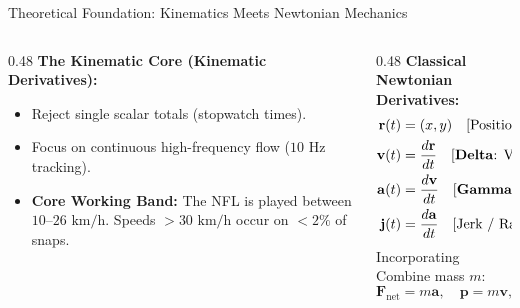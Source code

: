 \documentclass[aspectratio=169, 10pt]{beamer}
\begin{document}
\begin{frame}{Theoretical Foundation: Kinematics Meets Newtonian Mechanics}
  \begin{columns}[T]
    \begin{column}{0.48\textwidth}
      \textbf{The Kinematic Core (Kinematic Derivatives):}
      \begin{itemize}
        \item Reject single scalar totals (stopwatch times).
        \item Focus on continuous high-frequency flow ($10\text{ Hz}$ tracking).
        \item \textbf{Core Working Band:} The NFL is played between $10\text{--}26\text{ km/h}$. Speeds $>30\text{ km/h}$ occur on $<2\%$ of snaps.
      \end{itemize}
    \end{column}
    \begin{column}{0.48\textwidth}
      \textbf{Classical Newtonian Derivatives:}
      \begin{align*}
        \mathbf{r}(t) &= (x, y) \quad \text{[Position]} \\
        \mathbf{v}(t) &= \frac{d\mathbf{r}}{dt} \quad \text{[\textbf{Delta}: Velocity / Speed]} \\
        \mathbf{a}(t) &= \frac{d\mathbf{v}}{dt} \quad \text{[\textbf{Gamma}: Acceleration / Decel]} \\
        \mathbf{j}(t) &= \frac{d\mathbf{a}}{dt} \quad \text{[Jerk / Rate of Force Dev.]}
      \end{align*}
      Incorporating Combine mass $m$:
      $$\mathbf{F}_{\text{net}} = m\mathbf{a}, \quad \mathbf{p} = m\mathbf{v}, \quad P = \mathbf{F} \cdot \mathbf{v}$$
    \end{column}
  \end{columns}
\end{frame}
\end{document}
